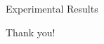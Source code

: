 \documentclass[10pt, xcolor=x11names,compress]{beamer}
\begin{document}
\begin{frame}{Experimental Results}

\end{frame}

\begin{frame}
 \begin{center}
		{\Huge Thank you!}\\
		
	\end{center}
\end{frame}
\end{document}

